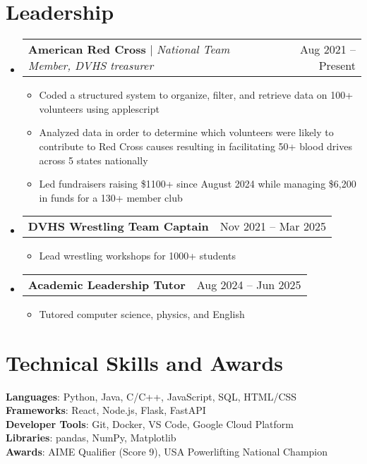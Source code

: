 \documentclass[letterpaper,11pt]{article}
\makeatletter
\newcommand{\resumeItem}[1]{
  \item\small{
    {#1 \vspace{-2pt}}
  }
}
\newcommand{\resumeProjectHeading}[2]{
    \item
    \begin{tabular*}{0.97\textwidth}{l@{\extracolsep{\fill}}r}
      \small#1 & #2 \\
    \end{tabular*}\vspace{-7pt}
}
\newcommand{\resumeSubHeadingListStart}{\begin{itemize}[leftmargin=0.15in, label={}]}
\newcommand{\resumeSubHeadingListEnd}{\end{itemize}}
\newcommand{\resumeItemListStart}{\begin{itemize}}
\newcommand{\resumeItemListEnd}{\end{itemize}\vspace{-5pt}}
\makeatother
\begin{document}
\section{Leadership}
    \resumeSubHeadingListStart
      \resumeProjectHeading
          {\textbf{American Red Cross} $|$ \emph{National Team Member, DVHS treasurer}}{Aug 2021 -- Present}
          \resumeItemListStart
            \resumeItem{Coded a structured system to organize, filter, and retrieve data on 100+ volunteers using applescript}
            \resumeItem{Analyzed data in order to determine which volunteers were likely to contribute to Red Cross causes resulting in facilitating 50+ blood drives across 5 states nationally}
            \resumeItem{Led fundraisers raising \$1100+ since August 2024 while managing \$6,200 in funds for a 130+ member club}
          \resumeItemListEnd
      \resumeProjectHeading
          {\textbf{DVHS Wrestling Team Captain}}{Nov 2021 -- Mar 2025}
          \resumeItemListStart
            \resumeItem{Lead wrestling workshops for 1000+ students}
          \resumeItemListEnd
      \resumeProjectHeading
          {\textbf{Academic Leadership Tutor}}{Aug 2024 -- Jun 2025}
          \resumeItemListStart
            \resumeItem{Tutored computer science, physics, and English}
          \resumeItemListEnd
    \resumeSubHeadingListEnd

\section{Technical Skills and Awards}
 \begin{itemize}[leftmargin=0.15in, label={}]
    \small{\item{
     \textbf{Languages}{: Python, Java, C/C++, JavaScript, SQL, HTML/CSS} \\
     \textbf{Frameworks}{: React, Node.js, Flask, FastAPI} \\
     \textbf{Developer Tools}{: Git, Docker, VS Code, Google Cloud Platform} \\
     \textbf{Libraries}{: pandas, NumPy, Matplotlib} \\
     \textbf{Awards}{: AIME Qualifier (Score 9), USA Powerlifting National Champion}
    }}
 \end{itemize}

\end{document}
